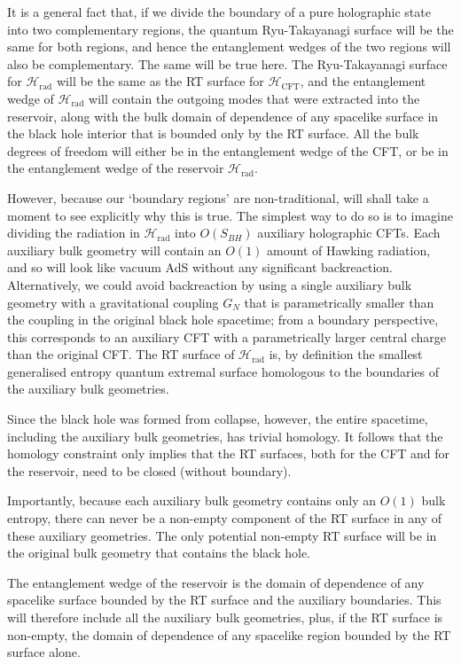\documentclass[12pt]{article}
\begin{document}
It is a general fact that, if we divide the boundary of a pure holographic state into two complementary regions, the quantum Ryu-Takayanagi surface will be the same for both regions, and hence the entanglement wedges of the two regions will also be complementary. The same will be true here. The Ryu-Takayanagi surface for $\mathcal{H}_\text{rad}$ will be the same as the RT surface for $\mathcal{H}_\text{CFT}$, and the entanglement wedge of $\mathcal{H}_\text{rad}$ will contain the outgoing modes that were extracted into the reservoir, along with the bulk domain of dependence of any spacelike surface in the black hole interior that is bounded only by the RT surface. All the bulk degrees of freedom will either be in the entanglement wedge of the CFT, or be in the entanglement wedge of the reservoir $\mathcal{H}_\text{rad}$.

However, because our `boundary regions' are non-traditional, will shall take a moment to see explicitly why this is true. The simplest way to do so is to imagine dividing the radiation in $\mathcal{H}_\text{rad}$ into $O(S_{BH})$ auxiliary holographic CFTs. Each auxiliary bulk geometry will contain an $O(1)$ amount of Hawking radiation, and so will look like vacuum AdS without any significant backreaction. Alternatively, we could avoid backreaction by using a single auxiliary bulk geometry with a gravitational coupling $G_N$ that is parametrically smaller than the coupling in the original black hole spacetime; from a boundary perspective, this corresponds to an auxiliary CFT with a parametrically larger central charge than the original CFT. The RT surface of $\mathcal{H}_\text{rad}$ is, by definition the smallest generalised entropy quantum extremal surface homologous to the boundaries of the auxiliary bulk geometries.

Since the black hole was formed from collapse, however, the entire spacetime, including the auxiliary bulk geometries, has trivial homology. It follows that the homology constraint only implies that the RT surfaces, both for the CFT and for the reservoir, need to be closed (without boundary).

Importantly, because each auxiliary bulk geometry contains only an $O(1)$ bulk entropy, there can never be a non-empty component of the RT surface in any of these auxiliary geometries. The only potential non-empty RT surface will be in the original bulk geometry that contains the black hole. 

The entanglement wedge of the reservoir is the domain of dependence of any spacelike surface bounded by the RT surface and the auxiliary boundaries. This will therefore include all the auxiliary bulk geometries, plus, if the RT surface is non-empty, the domain of dependence of any spacelike region bounded by the RT surface alone.
\end{document}
